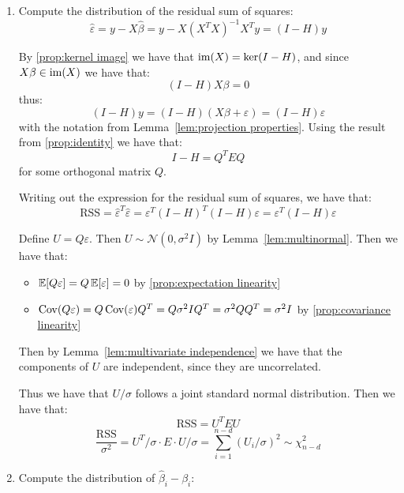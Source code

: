 \begin{enumerate}[label=Step \arabic*., align=left]
    \item Compute the distribution of the residual sum of squares: 
          \[\hat{\varepsilon}
              = y - X \hat{\beta}
              = y - X (X^TX)^{-1}X^T y
              = (I - H) y\]
          
          By \ref{prop:kernel image} we have that $\operatorname{im}(X) = \ker(I - H)$, and since $X\beta \in \operatorname{im}(X)$ we have that:
          \[(I - H) X\beta = 0\]
          thus:
          \[(I - H) y 
              = (I - H) (X\beta + \varepsilon) 
              = (I - H)\varepsilon\]
          with the notation from Lemma~\ref{lem:projection properties}. Using the result from \ref{prop:identity} we have that:
          \[I - H = Q^T E Q\]
          for some orthogonal matrix $Q$.
          
          Writing out the expression for the residual sum of squares, we have that:
          \[\text{RSS} 
              = \hat{\varepsilon}^T \hat{\varepsilon}
              = \varepsilon^T (I - H)^T (I - H) \varepsilon
              = \varepsilon^T (I - H) \varepsilon\]
          
          Define $U = Q \varepsilon$. Then $U \sim \mathcal{N}(0, \sigma^2 I)$ by Lemma~\ref{lem:multinormal}. Then we have that:
          \begin{itemize}                                                                                    
              \item $\operatorname{\mathbb{E}}[Q \varepsilon] = Q \operatorname{\mathbb{E}}[\varepsilon] = 0$ by \ref{prop:expectation linearity}
              \item $\operatorname{Cov}(Q \varepsilon) = Q \operatorname{Cov}(\varepsilon) Q^T = Q \sigma^2 I Q^T = \sigma^2 Q Q^T = \sigma^2 I$ by \ref{prop:covariance linearity}
          \end{itemize}
          
          Then by Lemma~\ref{lem:multivariate independence} we have that the components of $U$ are independent, since they are uncorrelated.
          
          Thus we have that $U/\sigma$ follows a joint standard normal distribution. Then we have that:
          \begin{equation} \label{eq:rss expansion}
              \text{RSS} = U^T E U
          \end{equation}
          \[\frac{\text{RSS}}{\sigma^2}
              = U^T / \sigma \cdot E \cdot U / \sigma
              = \sum_{i=1}^{n - d} (U_i / \sigma)^2
              \sim \chi^2_{n - d}\]
    \item Compute the distribution of $\hat{\beta}_i - \beta_i$:
          

\end{enumerate}
